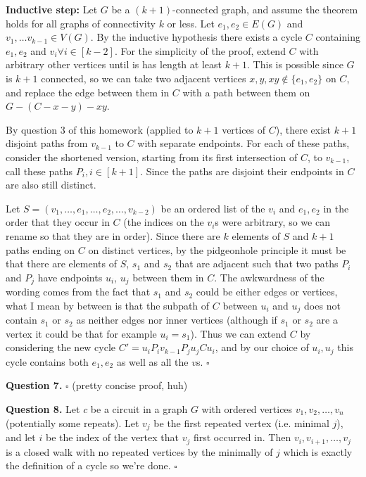 \documentclass[letterpaper, reqno,11pt]{article}
\begin{document}
{\noindent\bf Inductive step:} Let $G$ be a $(k+1)$-connected graph, and assume the theorem holds for all graphs of connectivity $k$ or less. Let $e_1,e_2\in E(G)$ and $v_1,\ldots v_{k-1}\in V(G)$. By the inductive hypothesis there exists a cycle $C$ containing $e_1,e_2$ and $v_i\forall i\in [k-2]$. For the simplicity of the proof, extend $C$ with arbitrary other vertices until is has length at least $k+1$. This is possible since $G$ is $k+1$ connected, so we can take two adjacent vertices $x,y, xy\notin \{e_1,e_2\} $ on $C$, and replace the edge between them in $C$ with a path between them on $G-(C-x-y)-xy$. 

By question 3 of this homework (applied to $k+1$ vertices of $C$), there exist $k+1$ disjoint paths from $v_{k-1}$ to $C$ with separate endpoints. For each of these paths, consider the shortened version, starting from its first intersection of $C$, to $v_{k-1}$, call these paths $P_i,i\in [k+1]$. Since the paths are disjoint their endpoints in $C$ are also still distinct. 

Let $S=(v_1,\ldots, e_1, \ldots, e_2,\ldots, v_{k-2})$ be an ordered list of the $v_i$ and $e_1,e_2$ in the order that they occur in $C$ (the indices on the $v_i$s were arbitrary, so we can rename so that they are in order). Since there are $k$ elements of $S$ and $k+1$ paths ending on $C$ on distinct vertices, by the pidgeonhole principle it must be that there are elements of $S$, $s_1$ and $s_2$ that are adjacent such that two paths $P_i$ and $P_j$ have endpoints $u_i$, $u_j$ between them in $C$. The awkwardness of the wording comes from the fact that $s_1$ and $s_2$ could be either edges or vertices, what I mean by between is that the subpath of $C$ between $u_i$ and $u_j$ does not contain $s_1$ or $s_2$ as neither edges nor inner vertices (although if $s_1$ or $s_2$ are a vertex it could be that for example $u_i=s_1$). Thus we can extend $C$ by considering the new cycle $C'=u_iP_iv_{k-1}P_ju_jCu_i$, and by our choice of $u_i,u_j$ this cycle contains both $e_1,e_2$ as well as all the $v$s. $\square$


{\medskip\noindent\bf Question 7.} $\square$ (pretty concise proof, huh)


{\medskip\noindent\bf Question 8.} Let $c$ be a circuit in a graph $G$ with ordered vertices $v_1,v_2,\ldots,v_n$ (potentially some repeats). Let $v_j$ be the first repeated vertex (i.e. minimal $j$), and let $i$ be the index of the vertex that $v_j$ first occurred in. Then $v_i, v_{i+1}, \ldots, v_j$ is a closed walk with no repeated vertices by the minimally of $j$ which is exactly the definition of a cycle so we're done. $\square$
\end{document}
